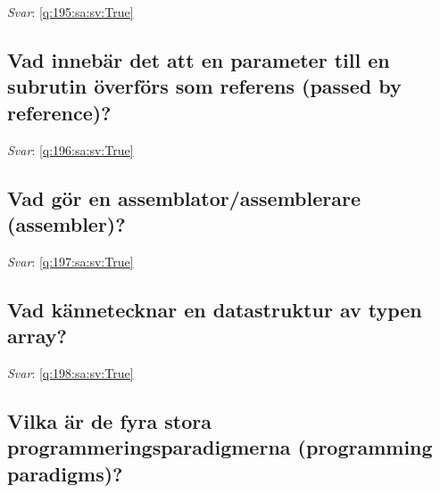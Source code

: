 \documentclass[a4paper,11pt,oneside]{article}
\begin{document}
\begin{sloppypar}
\textit{Svar}: \autoref{q:195:sa:sv:True}



\subsection{Vad inneb\"ar det att en parameter till en subrutin \"overf\"ors som referens (passed by reference)?}

\label{q:196:sa:sv:False}

\vspace{2cm}

\noindent\makebox[\textwidth]{\hrulefill}

\vspace{1cm}

\textit{Svar}: \autoref{q:196:sa:sv:True}



\subsection{Vad g\"or en assemblator/assemblerare (assembler)?}

\label{q:197:sa:sv:False}

\vspace{2cm}

\noindent\makebox[\textwidth]{\hrulefill}

\vspace{1cm}

\textit{Svar}: \autoref{q:197:sa:sv:True}



\subsection{Vad k\"annetecknar en datastruktur av typen array?}

\label{q:198:sa:sv:False}

\vspace{2cm}

\noindent\makebox[\textwidth]{\hrulefill}

\vspace{1cm}

\textit{Svar}: \autoref{q:198:sa:sv:True}



\subsection{Vilka \"ar de fyra stora programmeringsparadigmerna (programming paradigms)?}


\end{sloppypar}
\end{document}
